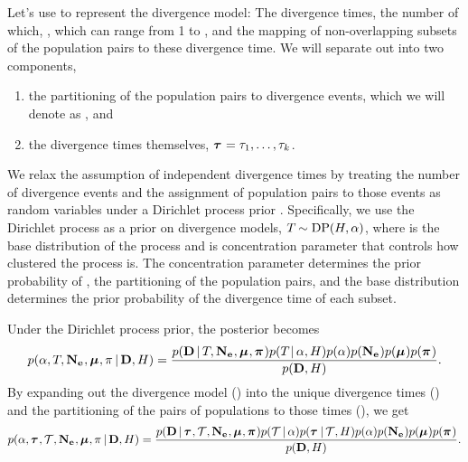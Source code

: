 Let's use \divtimemodel to represent the divergence model:
The divergence times, the number of which, \nevents, which can range from 1 to
\ncomparisons, and the mapping of non-overlapping subsets of the population
pairs to these \nevents divergence time.
We will separate out \divtimemodel into two components,
\begin{enumerate}
    \item the partitioning of the \ncomparisons population pairs to
        divergence events, which we will denote as \divtimesets, and
    \item the divergence times themselves,
        $\divtimes = \divtime[1], \ldots, \divtime[\nevents]$.
\end{enumerate}
We relax the assumption of independent divergence times by treating the number
of divergence events and the assignment of population pairs to those events as
random variables under a Dirichlet process prior \citep{Ferguson1973,
    Antoniak1974}.
Specifically, we use the Dirichlet process as a prior on divergence models,
$\divtimemodel \sim \dirp(\basedistribution, \concentration)$, where
\basedistribution is the base distribution of the process and \concentration is
concentration parameter that controls how clustered the process is.
The concentration parameter determines the prior probability of \divtimesets,
the partitioning of the population pairs, and the base distribution determines
the prior probability of the divergence time of each subset.

Under the Dirichlet process prior, the posterior becomes
\begin{equation}
    \pr(
    \concentration,
    \divtimemodel,
    \collectionpopsizes,
    \murates,
    \gfreq
    \given
    \alldata,
    \basedistribution
    )
    =
    \frac{
        \pr(
        \alldata
        \given
        \divtimemodel,
        \collectionpopsizes,
        \murates,
        \gfreqs
        )
        \pr(\divtimemodel \given \concentration, \basedistribution)
        \pr(\concentration)
        \pr(\collectionpopsizes)
        \pr(\murates)
        \pr(\gfreqs)
    }{
        \pr(
        \alldata,
        \basedistribution
        )
    }.
    \label{eq:bayesrule}
\end{equation}
By expanding out the divergence model (\divtimemodel) into the unique
divergence times (\divtimes) and the partitioning of the pairs of populations
to those times (\divtimesets), we get
\begin{equation}
    \pr(
    \concentration,
    \divtimes,
    \divtimesets,
    \collectionpopsizes,
    \murates,
    \gfreq
    \given
    \alldata,
    \basedistribution
    )
    =
    \frac{
        \pr(
        \alldata
        \given
        \divtimes,
        \divtimesets,
        \collectionpopsizes,
        \murates,
        \gfreqs
        )
        \pr(\divtimesets \given \concentration)
        \pr(\divtimes \given \divtimesets, \basedistribution)
        \pr(\concentration)
        \pr(\collectionpopsizes)
        \pr(\murates)
        \pr(\gfreqs)
    }{
        \pr(
        \alldata,
        \basedistribution
        )
    }.
    \label{eq:bayesruleexpanded}
\end{equation}


